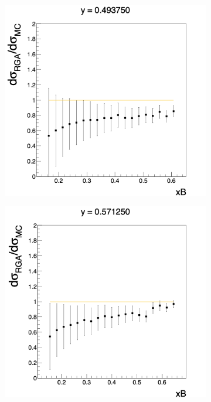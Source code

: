 \begin{figure}[h!]
	\centering
	\begin{subfigure}[b]{0.40\linewidth}
		\includegraphics[width=\linewidth]{figures/rga/ratio_2.png}
		\label{fig:rga_ratio2}
	\end{subfigure}
	\begin{subfigure}[b]{0.40\textwidth}
		\includegraphics[width=\linewidth]{figures/rga/ratio_3.png}
		\label{fig:rga_ratio3}
	\end{subfigure}
\end{figure}
